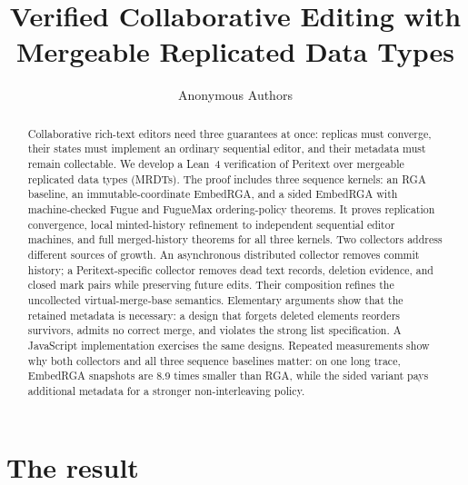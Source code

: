 

\title{Verified Collaborative Editing with Mergeable Replicated Data Types}
\author{Anonymous Authors}
\date{}

\newcommand{\ins}{\mathsf{ins}}
\newcommand{\del}{\mathsf{del}}
\newcommand{\render}{\mathsf{render}}
\newcommand{\seq}{\mathsf{seq}}
\newcommand{\ids}{\mathsf{ids}}


\maketitle

\begin{abstract}
Collaborative rich-text editors need three guarantees at once: replicas must
converge, their states must implement an ordinary sequential editor, and their
metadata must remain collectable. We develop a Lean~4 verification of Peritext
over mergeable replicated data types (MRDTs). The proof includes three
sequence kernels: an RGA baseline, an immutable-coordinate EmbedRGA,
and a sided EmbedRGA with machine-checked Fugue and FugueMax ordering-policy
theorems. It proves replication convergence, local minted-history refinement
to independent sequential editor machines, and full merged-history theorems
for all three kernels. Two collectors address
different sources of growth. An asynchronous distributed collector removes
commit history; a Peritext-specific collector removes dead text records,
deletion evidence, and closed mark pairs while preserving future edits. Their
composition refines the uncollected virtual-merge-base semantics. Elementary
arguments show that the retained metadata is necessary: a design that forgets
deleted elements reorders survivors, admits no correct merge, and violates the
strong list specification. A JavaScript
implementation exercises the same designs. Repeated measurements show why
both collectors and all three sequence baselines matter: on one long trace,
EmbedRGA snapshots are 8.9 times smaller than RGA, while the sided
variant pays additional metadata for a stronger non-interleaving policy.
\end{abstract}

\tableofcontents

\section{The result}

